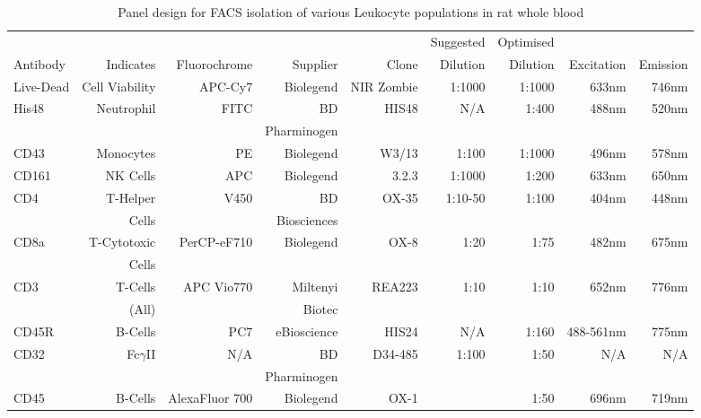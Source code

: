 \begin{sidewaystable}[!htbp]
\centering
\footnotesize
\begin{tabular}{lrrrrrrrr}
          &                       &                 &                 &             & Suggested & Optimised &             &           \\
Antibody  & Indicates             & Fluorochrome    & Supplier        & Clone       &  Dilution &  Dilution & Excitation  & Emission  \\
\hline
Live-Dead & Cell Viability        & APC-Cy7         & Biolegend       & NIR Zombie  & 1:1000    & 1:1000    & 633nm       & 746nm \\
His48     & Neutrophil            & FITC            & BD              & HIS48       & N/A       & 1:400     & 488nm       & 520nm \\
          &                       &                 & Pharminogen     &             &           &           &             &       \\
CD43      & Monocytes             & PE              & Biolegend       & W3/13       & 1:100     & 1:1000    & 496nm       & 578nm \\
CD161     & NK Cells              & APC             & Biolegend       & 3.2.3       & 1:1000    & 1:200     & 633nm       & 650nm \\
CD4       & T-Helper              & V450            & BD              & OX-35       & 1:10-50   & 1:100     & 404nm       & 448nm \\
          & Cells                 &                 & Biosciences     &             &           &           &             &       \\
CD8a      & T-Cytotoxic           & PerCP-eF710     & Biolegend       & OX-8        & 1:20      & 1:75      & 482nm       & 675nm \\
          & Cells                 &                 &                 &             &           &           &             &       \\
CD3       & T-Cells               & APC Vio770      & Miltenyi        & REA223      & 1:10      & 1:10      & 652nm       & 776nm \\
          & (All)                 &                 & Biotec          &             &           &           &             &       \\
CD45R     & B-Cells               & PC7             & eBioscience     & HIS24       & N/A       & 1:160     & 488-561nm   & 775nm \\
CD32      & Fc$\gamma$II          & N/A             & BD              & D34-485     & 1:100     & 1:50      & N/A         & N/A   \\
          &                       &                 & Pharminogen     &             &           &           &             &       \\
CD45      & B-Cells               & AlexaFluor 700  & Biolegend       & OX-1        &           & 1:50      & 696nm       & 719nm \\
\end{tabular}
\caption{Panel design for FACS isolation of various Leukocyte populations in rat whole blood}
\label{tab:9-colourPanel}
\end{sidewaystable}

